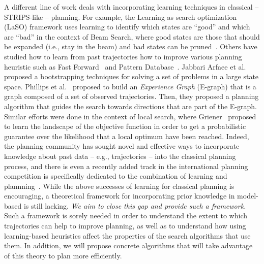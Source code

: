 \documentclass[12pt]{article}
\begin{document}
A different line of work deals with incorporating learning techniques in classical -- STRIPS-like -- planning. For example, the Learning as search optimization (LaSO) framework uses learning to identify which states are ``good'' and which are ``bad''
in the context of Beam Search, where good states are those that should be expanded (i.e., stay in the beam) and bad states can be pruned~\cite{xu2007discriminative}. Others have studied how to learn from past trajectories how to improve various planning heuristic such as Fast Forward~\cite{yoon2006learning} and Pattern Database~\cite{samadi2008learning}. Jabbari Arfaee et al.~\cite{arfaee2011learning} proposed a bootstrapping techniques for solving a set of problems in a large state space. 
Phillips et al.~\cite{phillips2012graphs} proposed to build an {\em Experience Graph} (E-graph) that is a graph composed of a set of observed trajectories. Then, they proposed a planning algorithm that guides the search towards directions that are part of the E-graph. 
Similar efforts were done in the context of local search, 
where Griener~\cite{greiner1996palo} proposed to learn
the landscape of the objective function in order to get a probabilistic guarantee over the likelihood that a local optimum have been reached. 
Indeed, the planning community has sought novel and effective ways to incorporate knowledge about past data -- e.g., trajectories -- into the classical planning process, and there is even a recently added track in the international planning competition is specifically dedicated to the combination of learning and plannning~\cite{fern2011first}.  
While the above successes of learning for classical planning is encouraging, a theoretical framework for incorporating prior knowledge in model-based is still lacking. {\em We aim to close this gap and provide such a framework.} Such a framework is sorely needed in order to understand the extent to which trajectories can help to improve planning, as well as to understand how using learning-based heuristics affect the properties of the search algorithms that use them. In addition, we will propose concrete algorithms that will take advantage of this theory to plan more efficiently. 
\end{document}
